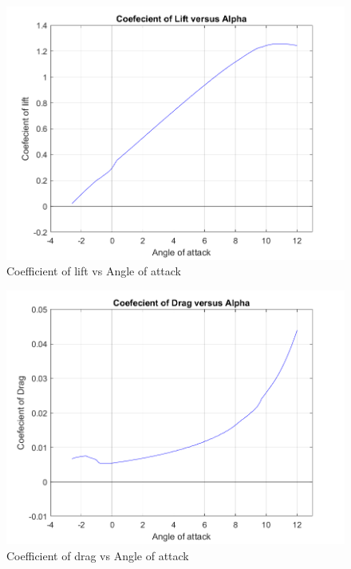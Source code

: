 \documentclass[12 pt]{article}
\begin{document}
\begin{figure}[H]
    \centering
     \includegraphics[scale = 0.8]{Codes/Week 6/Cl_alpha.png}
    \caption{Coefficient of lift vs Angle of attack}
    \label{Coefficient of lift vs Angle of attack}
\end{figure}

\begin{figure}[H]
    \centering
    \includegraphics[scale = 0.8]{Codes/Week 6/Cd_alpha.png}
    \caption{Coefficient of drag vs Angle of attack}
    \label{Coefficient of drag vs Angle of attack}
\end{figure}
\end{document}
